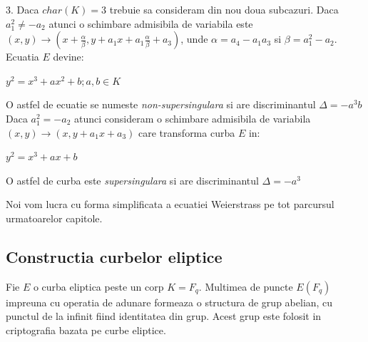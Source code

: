 \begin{dfn}
3. Daca $char(K) = 3$ trebuie sa consideram din nou doua subcazuri. Daca $a_1^2 \neq -a_2$ atunci o schimbare admisibila de variabila este
$(x, y) \rightarrow (x + \frac{\alpha}{\beta}, y + a_1x + a_1\frac{\alpha}{\beta} + a_3)$, unde $\alpha = a_4 -a_1a_3$ si $\beta = a_1^2 - a_2$. Ecuatia $E$ devine: 
\begin{center} $y^2 = x^3 + ax^2 + b; a, b\in K$\end{center}
O astfel de ecuatie se numeste \textit{non-supersingulara} si are discriminantul $\Delta = -a^3b$ \\
Daca $a_1^2 = -a_2$ atunci consideram o schimbare admisibila de variabila $(x, y) \rightarrow (x, y + a_1x + a_3)$ care transforma curba $E$ in:
\begin{center} $y^2 = x^3 + ax + b$ \end{center}
O astfel de curba este \textit{supersingulara} si are discriminantul $\Delta = -a^3$
\end{dfn}

\begin{obs}
Noi vom lucra cu forma simplificata a ecuatiei Weierstrass pe tot parcursul urmatoarelor capitole.
\end{obs}

\subsection{Constructia curbelor eliptice}
\label{subsec:subsec01}

\begin{dfn}
Fie $E$ o curba eliptica peste un corp $K = F_q$. Multimea de puncte $E(F_q)$ impreuna cu operatia de adunare formeaza o structura de grup abelian, cu punctul de la infinit fiind identitatea din grup. Acest grup este folosit in criptografia bazata pe curbe eliptice.
\end{dfn}

